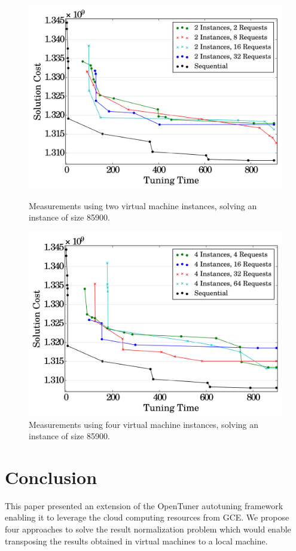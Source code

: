 \documentclass[12pt]{article}
\begin{document}
\begin{figure}[htpb]
    \centering
    \begin{minipage}{.45\textwidth}
        \centering
        \includegraphics[scale=.35]{i2_p_n_comparison_85900}
        \caption{Measurements using two virtual machine instances,
                 solving an instance of size 85900.}
        \label{fig:high-level}
    \end{minipage}%
    \hfill
    \begin{minipage}{.45\textwidth}
        \centering
        \includegraphics[scale=.35]{i4_p_n_comparison_85900}
        \caption{Measurements using four virtual machine instances,
                 solving an instance of size 85900.}
        \label{fig:low-level}
    \end{minipage}%
    \label{fig:archs}
\end{figure}

\section{Conclusion} \label{sec:conclusion}

This paper presented an extension of the OpenTuner autotuning framework
enabling it to leverage the cloud computing resources from GCE.  We propose
four approaches to solve the result normalization problem which would enable
transposing the results obtained in virtual machines to a local machine.



\end{document}
